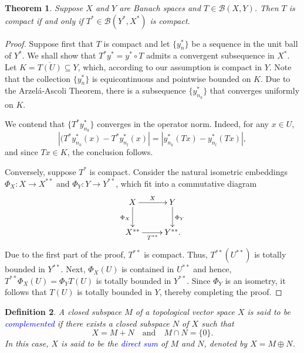 \documentclass[12pt]{article}
\theoremstyle{thmstyle}
\newtheorem{theorem}{Theorem}[section]
\theoremstyle{defstyle}
\newtheorem{definition}[theorem]{Definition}
\newcommand{\scrB}{\mathscr B}
\newcommand{\define}[1]{\textcolor{blue}{\textit{#1}}}
\begin{document}
\begin{theorem}
    Suppose $X$ and $Y$ are Banach spaces and $T\in\scrB(X, Y)$. Then $T$ is compact if and only if $T^\ast\in\scrB(Y^\ast, X^\ast)$ is compact.
\end{theorem}
\begin{proof}
    Suppose first that $T$ is compact and let $\{y_n^\ast\}$ be a sequence in the unit ball of $Y^\ast$. We shall show that $T^\ast y^\ast = y^\ast\circ T$ admits a convergent subsequence in $X^\ast$. Let $K = \overline{T(U)}\subseteq Y$, which, according to our assumption is compact in $Y$. Note that the collection $\{y_n^\ast\}$ is equicontinuous and pointwise bounded on $K$. Due to the Arzel\'a-Ascoli Theorem, there is a subsequence $\{y_{n_k}^\ast\}$ that converges uniformly on $K$. 
    
    We contend that $\{T^\ast y_{n_k}^\ast\}$ converges in the operator norm. Indeed, for any $x\in U$, 
    \begin{equation*}
        |(T^\ast y_{n_k}^\ast(x) - T^\ast y_{n_l}^\ast(x)| = |y_{n_k}^\ast(Tx) - y_{n_l}^\ast(Tx)|,
    \end{equation*}
    and since $Tx\in K$, the conclusion follows.

    Conversely, suppose $T^\ast$ is compact. Consider the natural isometric embeddings $\Phi_X: X\to X^{\ast\ast}$ and $\Phi_Y: Y\to Y^{\ast\ast}$, which fit into a commutative diagram 
    \begin{align}
        \xymatrix {
            X\ar[r]^X\ar[d]_{\Phi_X} & Y\ar[d]^{\Phi_Y}\\
            X^{\ast\ast}\ar[r]_{T^{\ast\ast}} & Y^{\ast\ast}.
        }
    \end{align}
    Due to the first part of the proof, $T^{\ast\ast}$ is compact. Thus, $T^{\ast\ast}(U^{\ast\ast})$ is totally bounded in $Y^{\ast\ast}$. Next, $\Phi_X(U)$ is contained in $U^{\ast\ast}$ and hence, $T^{\ast\ast}\Phi_X(U) = \Phi_Y T(U)$ is totally bounded in $Y^{\ast\ast}$. Since $\Phi_Y$ is an isometry, it follows that $T(U)$ is totally bounded in $Y$, thereby completing the proof.
\end{proof}

\begin{definition}
    A closed subspace $M$ of a topological vector space $X$ is said to be \define{complemented} if there exists a closed subspace $N$ of $X$ such that 
    \begin{equation*}
        X = M + N\quad\text{and}\quad M\cap N = \{0\}.
    \end{equation*}
    In this case, $X$ is said to be the \define{direct sum} of $M$ and $N$, denoted by $X = M\oplus N$.
\end{definition}
\end{document}
